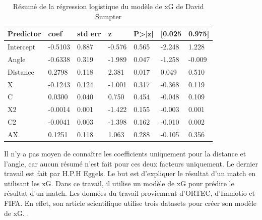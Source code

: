 \documentclass[12pt]{article}
\begin{document}
\begin{table}[htp]
    \centering
    \begin{tabular}{|l|l|l|l|l|l|l|}
        \hline
        \textbf{Predictor} & \textbf{coef} & \textbf{std err} & \textbf{z} & \textbf{P\textgreater{}|z|} & \textbf{{[}0.025} & \textbf{0.975{]}} \\ \hline
        Intercept          & -0.5103       & 0.887            & -0.576     & 0.565                       & -2.248            & 1.228             \\ \hline
        Angle              & -0.6338       & 0.319            & -1.989     & 0.047                       & -1.258            & -0.009            \\ \hline
        Distance           & 0.2798        & 0.118            & 2.381      & 0.017                       & 0.049             & 0.510             \\ \hline
        X                  & -0.1243       & 0.124            & -1.001     & 0.317                       & -0.368            & 0.119             \\ \hline
        C                  & 0.0300        & 0.040            & 0.750      & 0.454                       & -0.048            & 0.109             \\ \hline
        X2                 & -0.0014       & 0.001            & -1.422     & 0.155                       & -0.003            & 0.001             \\ \hline
        C2                 & -0.0041       & 0.003            & -1.398     & 0.162                       & -0.010            & 0.002             \\ \hline
        AX                 & 0.1251        & 0.118            & 1.063      & 0.288                       & -0.105            & 0.356             \\ \hline
    \end{tabular}
    \caption{Résumé de la régression logistique du modèle de xG de David Sumpter}
\end{table}
Il n'y a pas moyen de connaître les coefficients uniquement pour la distance et l'angle, car aucun résumé n'est fait pour ces deux facteurs uniquement.
\newline\newline
Le dernier travail est fait par H.P.H Eggels.
Le but est d'expliquer le résultat d'un match en utilisant les xG.
Dans ce travail, il utilise un modèle de xG pour prédire le résultat d'un match.
Les données du travail proviennent d'ORTEC, d'Immotio et FIFA. En effet, son article scientifique utilise trois datasets pour créer son modèle de xG. \cite{eggelsExpectedGoalsSoccer2016}.
\end{document}

